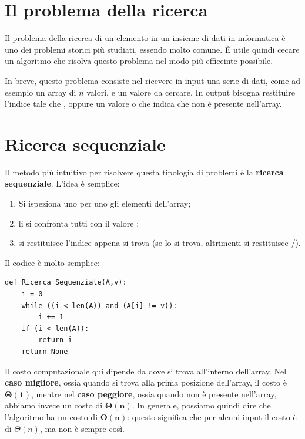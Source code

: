 \documentclass[11pt, a4paper, titlepage, oneside]{scrbook}
\begin{document}
\section{Il problema della ricerca}

Il problema della ricerca di un elemento in un insieme di dati in informatica è uno dei problemi storici più studiati, essendo molto comune. È utile quindi cecare un algoritmo che risolva questo problema nel modo più efficeinte possibile.

In breve, questo problema consiste nel ricevere in input una serie di dati, come ad esempio un array  di $n$ valori, e un valore  da cercare. In output bisogna restituire l'indice  tale che \mbox{}, oppure un valore  o  che indica che  non è presente nell'array.

\section{Ricerca sequenziale}

\begin{Definizione}
\label{def-ricerca-sequenziale}
Il metodo più intuitivo per risolvere questa tipologia di problemi è la \textbf{ricerca sequenziale}. L'idea è semplice:
\begin{enumerate}[label=\arabic*°]
    \item Si ispeziona uno per uno gli elementi dell'array;
    \item li si confronta tutti con il valore ;
    \item si restituisce l'indice  appena si trova  (se lo si trova, altrimenti si restituisce /).
\end{enumerate}
\end{Definizione}

Il codice è molto semplice:

\begin{lstlisting}[style=Python]
def Ricerca_Sequenziale(A,v):
    i = 0
    while ((i < len(A)) and (A[i] != v)):
        i += 1
    if (i < len(A)):
        return i
    return None
\end{lstlisting}

Il costo computazionale qui dipende da dove si trova  all'interno dell'array. Nel \textbf{caso migliore}, ossia quando  si trova alla prima posizione dell'array, il costo è $\bm{\Theta(1)}$, mentre nel \textbf{caso peggiore}, ossia quando  non è presente nell'array, abbiamo invece un costo di $\bm{\Theta(n)}$. In generale, possiamo quindi dire che l'algoritmo ha un costo di $\bm{\textbf{O}(n)}$: questo significa che per alcuni input il costo è di $\Theta(n)$, ma non è sempre così.
\end{document}
